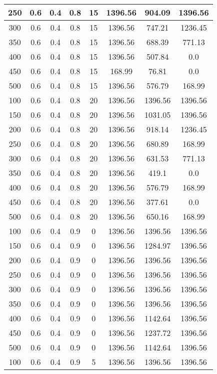 \documentclass[a4paper, 12pt]{extreport}
\begin{document}
\begin{itemize}
\begin{longtable}{|c|c|c|c|c|c|c|c|}
			250 & 0.6 & 0.4 & 0.8 & 15 & 1396.56 & 904.09 & 1396.56 \\\hline
			300 & 0.6 & 0.4 & 0.8 & 15 & 1396.56 & 747.21 & 1236.45 \\\hline
			350 & 0.6 & 0.4 & 0.8 & 15 & 1396.56 & 688.39 & 771.13 \\\hline
			400 & 0.6 & 0.4 & 0.8 & 15 & 1396.56 & 507.84 & 0.0 \\\hline
			450 & 0.6 & 0.4 & 0.8 & 15 & 168.99 & 76.81 & 0.0 \\\hline
			500 & 0.6 & 0.4 & 0.8 & 15 & 1396.56 & 576.79 & 168.99 \\\hline
			100 & 0.6 & 0.4 & 0.8 & 20 & 1396.56 & 1396.56 & 1396.56 \\\hline
			150 & 0.6 & 0.4 & 0.8 & 20 & 1396.56 & 1031.05 & 1396.56 \\\hline
			200 & 0.6 & 0.4 & 0.8 & 20 & 1396.56 & 918.14 & 1236.45 \\\hline
			250 & 0.6 & 0.4 & 0.8 & 20 & 1396.56 & 680.89 & 168.99 \\\hline
			300 & 0.6 & 0.4 & 0.8 & 20 & 1396.56 & 631.53 & 771.13 \\\hline
			350 & 0.6 & 0.4 & 0.8 & 20 & 1396.56 & 419.1 & 0.0 \\\hline
			400 & 0.6 & 0.4 & 0.8 & 20 & 1396.56 & 576.79 & 168.99 \\\hline
			450 & 0.6 & 0.4 & 0.8 & 20 & 1396.56 & 377.61 & 0.0 \\\hline
			500 & 0.6 & 0.4 & 0.8 & 20 & 1396.56 & 650.16 & 168.99 \\\hline
			100 & 0.6 & 0.4 & 0.9 & 0 & 1396.56 & 1396.56 & 1396.56 \\\hline
			150 & 0.6 & 0.4 & 0.9 & 0 & 1396.56 & 1284.97 & 1396.56 \\\hline
			200 & 0.6 & 0.4 & 0.9 & 0 & 1396.56 & 1396.56 & 1396.56 \\\hline
			250 & 0.6 & 0.4 & 0.9 & 0 & 1396.56 & 1396.56 & 1396.56 \\\hline
			300 & 0.6 & 0.4 & 0.9 & 0 & 1396.56 & 1396.56 & 1396.56 \\\hline
			350 & 0.6 & 0.4 & 0.9 & 0 & 1396.56 & 1396.56 & 1396.56 \\\hline
			400 & 0.6 & 0.4 & 0.9 & 0 & 1396.56 & 1142.64 & 1396.56 \\\hline
			450 & 0.6 & 0.4 & 0.9 & 0 & 1396.56 & 1237.72 & 1396.56 \\\hline
			500 & 0.6 & 0.4 & 0.9 & 0 & 1396.56 & 1142.64 & 1396.56 \\\hline
			100 & 0.6 & 0.4 & 0.9 & 5 & 1396.56 & 1396.56 & 1396.56 \\\hline

\end{longtable}
\end{itemize}
\end{document}
